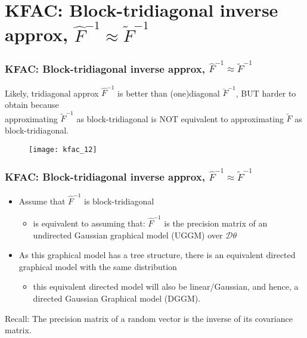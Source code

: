 \section{KFAC: Block-tridiagonal inverse approx, $\hat{F}^{-1} \approx \tilde{F}^{-1}$}

\begin{frame}
\frametitle{KFAC: Block-tridiagonal inverse approx, $\hat{F}^{-1} \approx \tilde{F}^{-1}$}
Likely, tridiagonal approx $\hat{F}^{-1}$ is better than (one)diagonal $\breve{F}^{-1}$,
BUT harder to obtain because\\
approximating $\tilde{F}^{-1}$ as block-tridiagonal is NOT equivalent to approximating $\tilde{F}$ as block-tridiagonal.

\begin{figure}
    \centering
    \texttt{[image: kfac\_12]}
\end{figure}

\end{frame}

\begin{frame}
\frametitle{KFAC: Block-tridiagonal inverse approx, $\hat{F}^{-1} \approx \tilde{F}^{-1}$}
\begin{itemize}
    \item Assume that $\hat{F}^{-1}$ is block-tridiagonal
        \begin{itemize}
            \item is equivalent to assuming that:
            $\hat{F}^{-1}$ is the precision matrix of an undirected Gaussian graphical model (UGGM) over $\mathcal{D}\theta$
        \end{itemize}
    \item As this graphical model has a tree structure, there is an equivalent
        directed graphical model with the same distribution
        \begin{itemize}
            \item this equivalent directed model will also be linear/Gaussian, and
            hence, a directed Gaussian Graphical model (DGGM).
        \end{itemize}
\end{itemize}

\vspace{10mm}
{\footnotesize
Recall: The precision matrix of a random vector is the inverse of its covariance matrix.
}
\end{frame}

